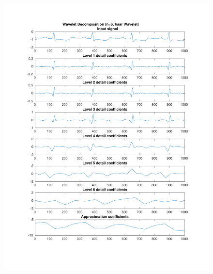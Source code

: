 \documentclass[11pt,a4paper]{article}
\begin{document}
\begin{figure}[H]
\centering
\begin{minipage}{0.48\textwidth}
	\centering
	\includegraphics[width=\textwidth]{fig/112l1_dwt1.pdf}
\end{minipage}
\begin{minipage}{0.48\textwidth}
	\centering

\end{minipage}
\end{figure}
\end{document}
